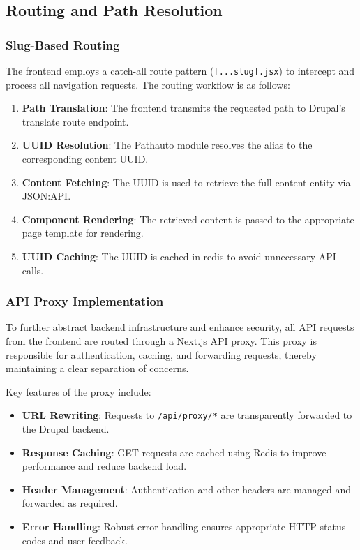 \subsection{Routing and Path Resolution}

\subsubsection{Slug-Based Routing}
\noindent
The frontend employs a catch-all route pattern (\texttt{[...slug].jsx}) to intercept and process all navigation requests. The routing workflow is as follows:

\begin{enumerate}
    \item \textbf{Path Translation}: The frontend transmits the requested path to Drupal's translate route endpoint.
    \item \textbf{UUID Resolution}: The Pathauto module resolves the alias to the corresponding content UUID.
    \item \textbf{Content Fetching}: The UUID is used to retrieve the full content entity via JSON:API.
    \item \textbf{Component Rendering}: The retrieved content is passed to the appropriate page template for rendering.
    \item \textbf{UUID Caching}: The UUID is cached in redis to avoid unnecessary API calls.
\end{enumerate}



\subsubsection{API Proxy Implementation}
\noindent
To further abstract backend infrastructure and enhance security, all API requests from the frontend are routed through a Next.js API proxy. This proxy is responsible for authentication, caching, and forwarding requests, thereby maintaining a clear separation of concerns.

Key features of the proxy include:

\begin{itemize}
    \item \textbf{URL Rewriting}: Requests to \texttt{/api/proxy/*} are transparently forwarded to the Drupal backend.
    \item \textbf{Response Caching}: GET requests are cached using Redis to improve performance and reduce backend load.
    \item \textbf{Header Management}: Authentication and other headers are managed and forwarded as required.
    \item \textbf{Error Handling}: Robust error handling ensures appropriate HTTP status codes and user feedback.
\end{itemize}

